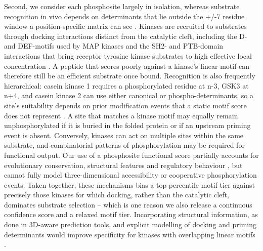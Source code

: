 \documentclass[
  number,
  preprint,
  onecolumn]{elsarticle}
\begin{document}
Second, we consider each phosphosite largely in isolation, whereas
substrate recognition in vivo depends on determinants that lie outside
the +/-7 residue window a position-specific matrix can see
\citep{Miller2018-hi}. Kinases are recruited to substrates through
docking interactions distinct from the catalytic cleft, including the D-
and DEF-motifs used by MAP kinases and the SH2- and PTB-domain
interactions that bring receptor tyrosine kinase substrates to high
effective local concentration \citep{Miller2018-hi}. A peptide that
scores poorly against a kinase's linear motif can therefore still be an
efficient substrate once bound. Recognition is also frequently
hierarchical: casein kinase 1 requires a phosphorylated residue at n-3,
GSK3 at n+4, and casein kinase 2 can use either canonical or
phospho-determinants, so a site's suitability depends on prior
modification events that a static motif score does not represent
\citep{Miller2018-hi}. A site that matches a kinase motif may equally
remain unphosphorylated if it is buried in the folded protein or if an
upstream priming event is absent. Conversely, kinases can act on
multiple sites within the same substrate, and combinatorial patterns of
phosphorylation may be required for functional output. Our use of a
phosphosite functional score partially accounts for evolutionary
conservation, structural features and regulatory behaviour
\citep{Ochoa2020-og}, but cannot fully model three-dimensional
accessibility or cooperative phosphorylation events. Taken together,
these mechanisms bias a top-percentile motif tier against precisely
those kinases for which docking, rather than the catalytic cleft,
dominates substrate selection -- which is one reason we also release a
continuous confidence score and a relaxed motif tier. Incorporating
structural information, as done in 3D-aware prediction tools, and
explicit modelling of docking and priming determinants would improve
specificity for kinases with overlapping linear motifs
\citep{Miller2018-hi, Liu2023-re}.
\end{document}
